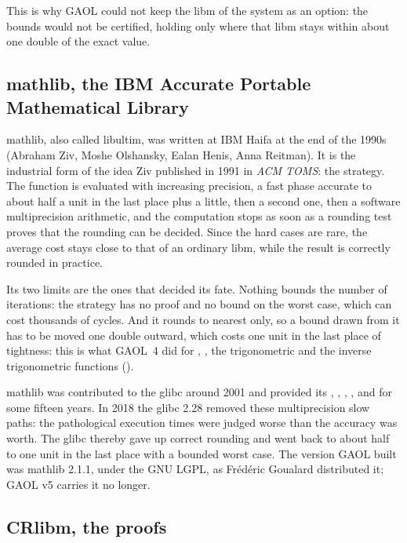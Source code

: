 \documentclass[12pt,a4paper,twoside,openright]{book}
\begin{document}
\medskip
This is why GAOL could not keep the libm of the system as an option: the
bounds would not be certified, holding only where that libm stays within
about one double of the exact value.

\subsection{mathlib, the IBM Accurate Portable Mathematical Library}

mathlib, also called libultim, was written at IBM Haifa at the end of the
1990s (Abraham Ziv, Moshe Olshansky, Ealan Henis, Anna Reitman). It is the
industrial form of the idea Ziv published in 1991 in \emph{ACM TOMS}: the
 strategy. The function is evaluated with increasing
precision, a fast phase accurate to about half a unit in the last place
plus a little, then a second one, then a software multiprecision
arithmetic, and the computation stops as soon as a rounding test proves
that the rounding can be decided. Since the hard cases are rare, the
average cost stays close to that of an ordinary libm, while the result is
correctly rounded in practice.

\medskip
Its two limits are the ones that decided its fate. Nothing bounds the
number of iterations: the strategy has no proof and no bound on the worst
case, which can cost thousands of cycles. And it rounds to nearest only, so
a bound drawn from it has to be moved one double outward, which costs one
unit in the last place of tightness: this is what GAOL~4 did for
, , the trigonometric and the inverse trigonometric
functions ().

\medskip
mathlib was contributed to the glibc around 2001 and provided its
, , , ,  and 
for some fifteen years. In 2018 the glibc 2.28 removed these
multiprecision slow paths: the pathological execution times were judged
worse than the accuracy was worth. The glibc thereby gave up correct
rounding and went back to about half to one unit in the last place with a
bounded worst case. The version GAOL built was mathlib 2.1.1, under the GNU
LGPL, as Fr\'ed\'eric Goualard distributed it; GAOL v5 carries it no
longer.\newinvfive

\subsection{CRlibm, the proofs}
\end{document}
